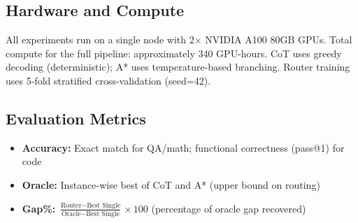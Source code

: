 \subsection{Hardware and Compute}

All experiments run on a single node with 2$\times$ NVIDIA A100 80GB GPUs. Total compute for the full pipeline: approximately 340 GPU-hours. CoT uses greedy decoding (deterministic); A* uses temperature-based branching. Router training uses 5-fold stratified cross-validation (seed=42).

\subsection{Evaluation Metrics}

\begin{itemize}
\item \textbf{Accuracy:} Exact match for QA/math; functional correctness (pass@1) for code
\item \textbf{Oracle:} Instance-wise best of CoT and A* (upper bound on routing)
\item \textbf{Gap\%:} $\frac{\text{Router} - \text{Best Single}}{\text{Oracle} - \text{Best Single}} \times 100$ (percentage of oracle gap recovered)
\end{itemize}
